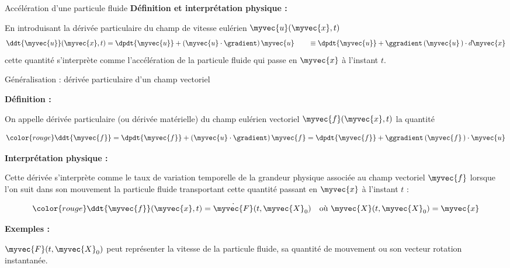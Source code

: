 \begin{frame}{Accélération d'une particule fluide}
\textbf{Définition et interprétation physique :} \medskip

En introduisant la dérivée particulaire du champ de vitesse eulérien $\myvec{u}(\myvec{x}, t)$
\[
	\ddt{\myvec{u}}(\myvec{x}, t) = \dpdt{\myvec{u}} + \left ( \myvec{u} \cdot \gradient \right )\myvec{u} 
\qquad
\equiv
        \dpdt{\myvec{u}} + 
	{\ggradient \left ( \myvec{u} \, \right ) \cdot d\myvec{x}} 	
\]
cette quantité s'interprète comme l'\textcolor{vert}{accélération de la particule fluide 
qui passe en $\myvec{x}$ à l'instant $t$}.

\vspace{3mm}

\end{frame}

\begin{frame}{Généralisation : dérivée particulaire d'un champ vectoriel}

\small

\textbf{Définition :} \medskip

On appelle \textcolor{vert}{dérivée particulaire} (ou dérivée matérielle) 
du champ eulérien vectoriel $\myvec{f}(\myvec{x}, t)$ la quantité

\[
	\color{rouge}
	\ddt{\myvec{f}} 
	=
	\dpdt{\myvec{f}} + \left( \myvec{u} \cdot \gradient \right ) \myvec{f} 
	=
	\dpdt{\myvec{f}} + \ggradient \left ( \myvec{f} \, \right ) \cdot \myvec{u} 
\]


\bigskip

\textbf{Interprétation physique :} \medskip

Cette dérivée s'interprète comme le taux de variation temporelle de la grandeur physique associée au champ vectoriel $\myvec{f}$ lorsque l'on suit dans son mouvement la particule fluide transportant cette quantité passant en $\myvec{x}$ à l'instant $t$ :

\[
	{\color{rouge}
	\ddt{\myvec{f}}(\myvec{x},t) = \dot{\myvec{F}}(t, \myvec{X}_0)}
	\quad \mbox{où $\myvec{X}(t, \myvec{X}_0) = \myvec{x}$} 
\]

\textbf{Exemples :} \medskip

$\myvec{F}(t, \myvec{X}_0)$ peut représenter la vitesse de la particule fluide, 
sa quantité de mouvement ou son vecteur rotation instantanée.

\vspace{10mm}

\end{frame}


